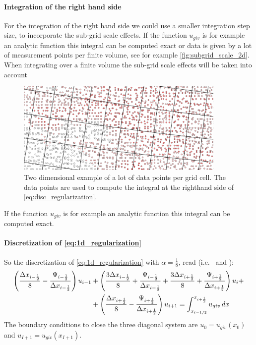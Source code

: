 \paragraph*{Integration of the right hand side}
For the integration of the right hand side we could use a smaller integration step size, to incorporate the sub-grid scale effects.
If the function $u_{giv}$ is for example an analytic function this integral can be computed exact or data is given by a lot of measurement points per finite volume, see for example \autoref{fig:subgrid_scale_2d}.
When integrating over a finite volume the sub-grid scale effects will be taken into account
\begin{figure}[H]
    \centering
    \includegraphics[width=0.9\textwidth]{figures/subgrid_scale_2d.png}
    \caption{Two dimensional example of a lot of data points per grid cell. The data points are used to compute the integral at the righthand side of \autoref{eq:disc_regularization}. \label{fig:subgrid_scale_2d}}
\end{figure}
If the function $u_{giv}$ is for example an analytic function this integral can be  computed exact.

\paragraph*{Discretization of \autoref{eq:1d_regularization}}
So the discretization of \autoref{eq:1d_regularization} with $\alpha = \frac{1}{8}$, read (i.e.\ \citet[eq.\ 7]{Borsboom1998} and \citet[eq.\ 6]{Borsboom2003}):
\begin{align}
\left( \frac{\Delta x_{i-\frac{1}{2}}}{8}
- \frac{\Psi_{i-\frac{1}{2}}}{\Delta x_{i-\frac{1}{2}}} \right)  u_{i-1} &
+ \left( \frac{3\Delta x_{i-\frac{1}{2}}}{8}  + \frac{\Psi_{i-\frac{1}{2}}}{{\Delta x_{i-\frac{1}{2}}}}  + \frac{3\Delta x_{i+\frac{1}{2}}}{8} +  \frac{\Psi_{i+\frac{1}{2}}}{{\Delta x_{i+\frac{1}{2}}}} \right)  u_i +
\\
& + \left(  \frac{\Delta x_{i+\frac{1}{2}}}{8} - \frac{\Psi_{i+\frac{1}{2}}}{{\Delta x_{i+\frac{1}{2}}}} \right)  u_{i+1}  = \int_{x_{i-1/2}}^{x_{i+\frac{1}{2}}} u_{giv}\, dx
\label{eq:disc_regularization}
\end{align}
The boundary conditions to close the three diagonal system are $u_0  = {u_{giv}}(x_{0})$ and $u_{I+1} = {u_{giv}}(x_{I+1})$.

